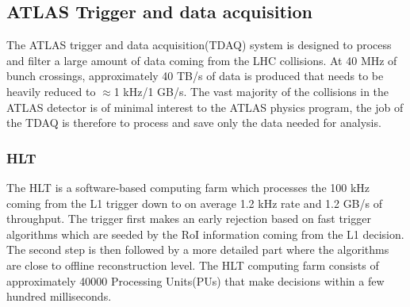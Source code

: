 \subsection{ATLAS Trigger and data acquisition}

The ATLAS trigger and data acquisition(TDAQ)\cite{ATLAS-TDR-PhaseI} system is designed to process and filter a large amount of data coming from the LHC collisions. At 40 MHz of bunch crossings, approximately 40 TB/s of data is produced that needs to be heavily reduced to $\approx$1 kHz/1 GB/s. The vast majority of the collisions in the ATLAS detector is of minimal interest to the ATLAS physics program, the job of the TDAQ is therefore to process and save only the data needed for analysis. 

\subsubsection{HLT}

The HLT is a software-based computing farm which processes the 100 kHz coming from the L1 trigger down to on average 1.2 kHz rate and 1.2 GB/s of throughput. The trigger first makes an early rejection based on fast trigger algorithms which are seeded by the RoI information coming from the L1 decision. The second step is then followed by a more detailed part where the algorithms are close to offline reconstruction level. The HLT computing farm consists of approximately 40000 Processing Units(PUs) that make decisions within a few hundred milliseconds\cite{ATLASTriggerRun2}.
